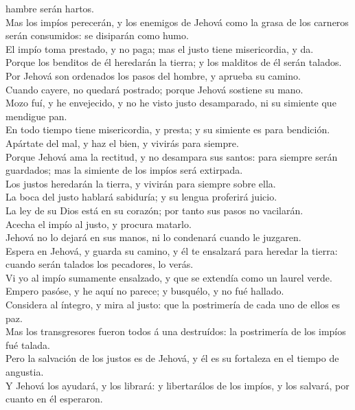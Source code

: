 hambre serán hartos.\\
 Mas los impíos perecerán, y los enemigos de Jehová como la
grasa de los carneros serán consumidos: se disiparán como humo.\\
 El impío toma prestado, y no paga; mas el justo tiene
misericordia, y da.\\
 Porque los benditos de él heredarán la tierra; y los
malditos de él serán talados.\\
 Por Jehová son ordenados los pasos del hombre, y aprueba
su camino.\\
 Cuando cayere, no quedará postrado; porque Jehová sostiene
su mano.\\
 Mozo fuí, y he envejecido, y no he visto justo
desamparado, ni su simiente que mendigue pan.\\
 En todo tiempo tiene misericordia, y presta; y su simiente
es para bendición.\\
 Apártate del mal, y haz el bien, y vivirás para siempre.\\
 Porque Jehová ama la rectitud, y no desampara sus santos:
para siempre serán guardados; mas la simiente de los impíos será
extirpada.\\
 Los justos heredarán la tierra, y vivirán para siempre
sobre ella.\\
 La boca del justo hablará sabiduría; y su lengua proferirá
juicio.\\
 La ley de su Dios está en su corazón; por tanto sus pasos
no vacilarán.\\
 Acecha el impío al justo, y procura matarlo.\\
 Jehová no lo dejará en sus manos, ni lo condenará cuando
le juzgaren.\\
 Espera en Jehová, y guarda su camino, y él te ensalzará
para heredar la tierra: cuando serán talados los pecadores, lo verás.\\
 Vi yo al impío sumamente ensalzado, y que se extendía como
un laurel verde.\\
 Empero pasóse, y he aquí no parece; y busquélo, y no fué
hallado.\\
 Considera al íntegro, y mira al justo: que la postrimería
de cada uno de ellos es paz.\\
 Mas los transgresores fueron todos á una destruídos: la
postrimería de los impíos fué talada.\\
 Pero la salvación de los justos es de Jehová, y él es su
fortaleza en el tiempo de angustia.\\
 Y Jehová los ayudará, y los librará: y libertarálos de los
impíos, y los salvará, por cuanto en él esperaron.

